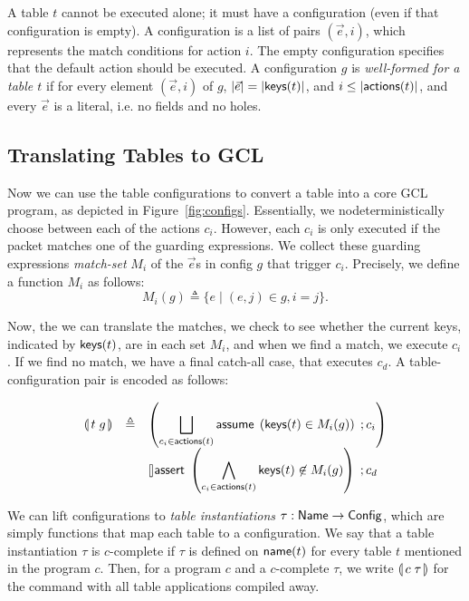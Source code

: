 A table $t$ cannot be executed alone; it must have a configuration
(even if that configuration is empty). A configuration is a list of
pairs $(\vec e,i)$, which represents the match conditions for action
$i$. The empty configuration specifies that the default action should
be executed. A configuration $g$ is \emph{well-formed for a table $t$}
if for every element $(\vec e, i)$ of $g$, $|\vec e| = |\mathsf{keys}(t)|$, and
$i \leq |\mathsf{actions}(t)|$, and every $\vec e$ is a literal, i.e. no fields
and no holes.

\subsection{Translating Tables to GCL}

Now we can use the table configurations to convert a table into a core
GCL program, as depicted in Figure~\ref{fig:configs}. Essentially, we
nodeterministically choose between each of the actions $c_i$. However,
each $c_i$ is only executed if the packet matches one of the guarding
expressions. We collect these guarding expressions \emph{match-set}
$M_i$ of the $\vec e$s in config $g$ that trigger $c_i$. Precisely, we
define a function $M_i$ as follows:
\[M_i(g) \triangleq \{ e \mid (e,j) \in g, i = j\}.\]

Now, the we can translate the matches, we check to see whether the
current keys, indicated by $\mathsf{keys}(t)$, are in each set $M_i$, and when
we find a match, we execute $c_i$. If we find no match, we have a
final catch-all case, that executes $c_d$. A table-configuration pair
is encoded as follows:

\[ \begin{array}{lcl}
     \llparenthesis\, t\; g\, \rrparenthesis
     & \triangleq
     & \left( \displaystyle \bigsqcup_{c_i \in \mathsf{actions}(t)}
        \mathsf{assume}\; \left(\mathsf{keys}(t) \in M_i(g)\right)\;; c_i\right)\\
     && \displaystyle \talloblong \mathsf{assert}\; \left(\bigwedge_{c_i \in \mathsf{actions}(t)} \mathsf{keys}(t) \not\in M_i(g)\right)\;; c_d
   \end{array}
\]

We can lift configurations to \emph{table instantiations}
$\tau : \mathsf{Name} \to \mathsf{Config}$, which are simply functions that map each table to a
configuration. We say that a table instantiation $\tau$ is $c$-complete if
$\tau$ is defined on $\mathsf{name}(t)$ for every table $t$ mentioned in the program
$c$. Then, for a program $c$ and a $c$-complete $\tau$, we write
$\llparenthesis\, c\; \tau\, \rrparenthesis$ for the command with all table applications compiled away.

